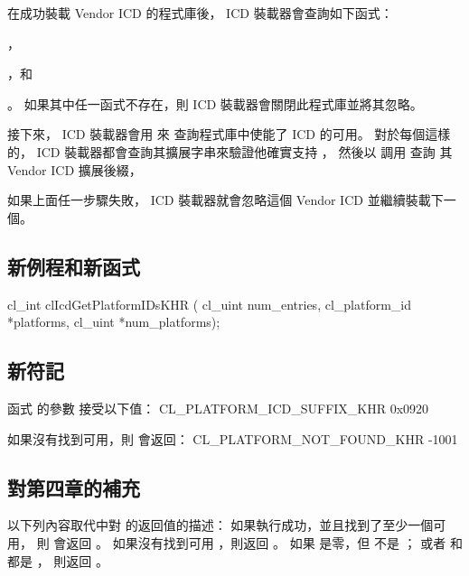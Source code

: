 在成功裝載 Vendor ICD 的程式庫後，
 ICD 裝載器會查詢如下函式：
\startigBase[indentnext=no]
\item {}，
\item {}，和
\item {}。
\stopigBase
如果其中任一函式不存在，則 ICD 裝載器會關閉此程式庫並將其忽略。

接下來， ICD 裝載器會用  來
查詢程式庫中使能了 ICD 的可用。
對於每個這樣的，
 ICD 裝載器都會查詢其擴展字串來驗證他確實支持 ，
然後以  調用  查詢
其 Vendor ICD 擴展後綴，

如果上面任一步驟失敗， ICD 裝載器就會忽略這個 Vendor ICD 並繼續裝載下一個。

\subsection{新例程和新函式}

\startCLFUNC
cl_int clIcdGetPlatformIDsKHR (
			cl_uint num_entries,
			cl_platform_id *platforms,
			cl_uint *num_platforms);
\stopCLFUNC

\subsection{新符記}

函式  的參數  接受以下值：
\startclc
CL_PLATFORM_ICD_SUFFIX_KHR	0x0920
\stopclc

如果沒有找到可用，則  會返回：
\startclc
CL_PLATFORM_NOT_FOUND_KHR	-1001
\stopclc

\subsection{對第四章的補充}

以下列內容取代\insection[queryPlf]中對  的返回值的描述：
\startreplacepar
如果執行成功，並且找到了至少一個可用，
則  會返回 。
如果沒有找到可用 ，則返回 。
如果  是零，但  不是 ；
或者  和  都是 ，
則返回 。
\stopreplacepar

